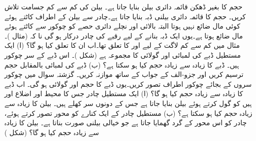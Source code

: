  حجم کا بغیر ڈھکن قائمہ دائری بیلن  بنایا جاتا ہے۔  بیلن کی  کم سے کم جسامت تلاش کریں۔
 حجم کا  قائمہ دائری بیلنی ڈبہ  بنایا جاتا ہے۔چادر سے بیلن کے اطراف کاٹتے ہوئے کوئی مال ضائع نہیں ہوتا  البتہ بالائی اور نچلے دائری حصے کو  چوکور سے کاٹتے ہوئے مال ضائع ہوتا ہے۔یوں ایک ڈبہ بنانے کے لیے  رقبے کی چادر درکار ہو گی نا کہ  (مثال )۔ مثال   میں کم سے کم لاگت کے لیے  اور  کا تعلق   تھا۔اب ان کا تعلق کیا ہو گا؟
(ا) ایک مستطیل ڈبے  کی لمبائی اور گولائی کا مجموعہ  ہے (شکل )۔ اس ڈبے  کے سر چوکور ہیں۔ ڈبے کا زیادہ سے زیادہ حجم کیا ہو سکتا ہے؟   (ب)  ڈبے کی لمبائی بالمقابل حجم ترسیم کریں اور جزو-الف کے جواب کے ساتھ موازنہ کریں۔
گزشتہ سوال میں چوکور سروں کے بجائے چوکور اطراف تصور کریں۔یوں ڈبے کا حجم  اور  گولائی  ہو گی۔ اب ڈبے کا  زیادہ سے زیادہ حجم کیا ہو گا؟
(ا) ایک مستطیل چادر جس کا محیط  اور  اضلاع  اور  ہیں کو گول کرتے ہوئے بیلن بنایا جاتا ہے جس کے دونوں  سر کھلے ہیں۔ بیلن کا  زیادہ سے زیادہ حجم کیا ہو سکتا ہے؟ (ب)  مستطیل چادر کے ایک کنارے کو محور تصور کرتے ہوئے، چادر کو اس محور کے گرد گھمایا جاتا ہے جو خیالی بیلنی صورت بناتا ہے۔ بیلن کا زیادہ سے زیادہ حجم کیا ہو گا؟   (شکل )
